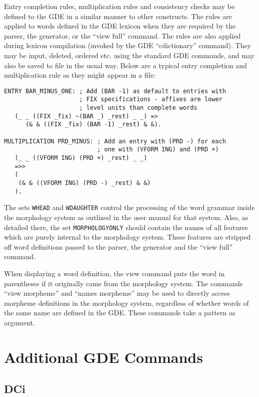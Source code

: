 Entry completion rules, multiplication rules and consistency checks may
be defined to the GDE in a similar manner to other constructs. The rules
are applied to words defined in the GDE lexicon when they are required
by the parser, the generator, or the ``view full'' command. The rules are also
applied during lexicon compilation (invoked by the GDE ``cdictionary''
command). They may be input, deleted, ordered etc. using the standard
GDE commands, and may also be saved to file in the usual way. Below
are a typical entry completion and multiplication rule as they
might appear in a file:
\begin{ex}
\begin{verbatim}
ENTRY BAR_MINUS_ONE: ; Add (BAR -1) as default to entries with 
                     ; FIX specifications - affixes are lower
                     ; level units than complete words
   (_ _ ((FIX _fix) ~(BAR _) _rest) _ _) =>
      (& & ((FIX _fix) (BAR -1) _rest) & &).

MULTIPLICATION PRD_MINUS: ; Add an entry with (PRD -) for each
                          ; one with (VFORM ING) and (PRD +)
   (_ _ ((VFORM ING) (PRD +) _rest) _ _)
   =>>
   (    
    (& & ((VFORM ING) (PRD -) _rest) & &)
   ).
\end{verbatim}
\end{ex}

The sets {\tt WHEAD} and {\tt WDAUGHTER} control the processing
of the word grammar inside the morphology system as outlined in the user
manual for that system.  Also, as detailed there, the set {\tt MORPHOLOGYONLY}
should contain the names of all features which are
purely internal to the morphology system.  These features are stripped
off word definitions passed to the parser, the generator and the ``view full''
command.

When displaying a word definition, the view command puts the word in
parentheses if it originally came from the morphology system. The
commands ``view morpheme'' and ``names morpheme'' may be used to
directly access morpheme definitions in the morphology system,
regardless of whether words of the same name are defined in the GDE.
These commands take a pattern as argument.

\section{Additional GDE Commands}

\subsection{DCi}

